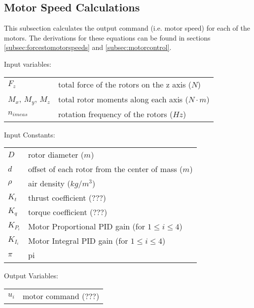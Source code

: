 \documentclass{article}
\numberwithin{equation}{section} %
\begin{document}
\subsection{Motor Speed Calculations} \label{subsec:motorspeedcalculations}
This subsection calculates the output command (i.e. motor speed) for each of the motors. The derivations for these equations can be found in sections \ref{subsec:forcestomotorspeeds} and \ref{subsec:motorcontrol}.

\bigskip
Input variables:
\begin{tabular}{l l}
 	$ F_{z} $				& total force of the rotors on the z axis ($N$) \\
 	$ M_{x}$, $M_y$, $M_{z} $		& total rotor moments along each axis ($N \cdot m$) \\
 	$ n_{imeas} $					& rotation frequency of the rotors ($Hz$) \\

\end{tabular}

\bigskip
Input Constants:
\begin{tabular}{l l}
 	$ D $ 					& rotor diameter ($m$) \\
 	$ d $					& offset of each rotor from the center of mass ($m$) \\
 	$ \rho $				& air density ($kg/m^3$) \\
 	$ K_t $					& thrust coefficient ($???$) \\
 	$ K_q $					& torque coefficient ($???$) \\
 	$ K_{P_i} $				& Motor Proportional PID gain (for $1 \leq i \leq 4$) \\
 	$ K_{I_i} $				& Motor Integral PID gain (for $1 \leq i \leq 4$) \\
 	$ \pi $					& pi \\
\end{tabular}

\bigskip
Output Variables:
\begin{tabular}{l l}
 	$ u_i $					& motor command ($???$) \\
\end{tabular}

\end{document}
